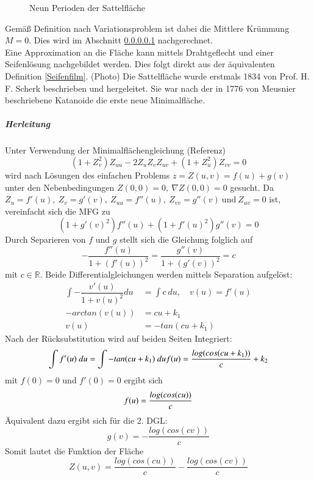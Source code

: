 \begin{refsection}
\begin{figure}[H]
  \caption{Neun Perioden der Sattelfläche} 
\end{figure}
Gemäß Definition nach Variationsproblem ist dabei die Mittlere Krümmung $M=0$. Dies wird im Abschnitt \ref{Scherk Herleitung}  nachgerechnet.\\ Eine Approximation an die Fläche kann mittels Drahtgeflecht und einer Seifenlösung nachgebildet werden. Dies folgt direkt aus der äquivalenten Definition \ref{Seifenfilm}. (Photo)
Die Sattelfläche wurde erstmals 1834 von Prof. H. F. Scherk beschrieben und hergeleitet. Sie war nach der in 1776 von Meusnier beschriebene Katanoide die erste neue Minimalfläche. 
\subparagraph{Herleitung}\label{Scherk Herleitung}
Unter Verwendung der Minimalflächengleichung (Referenz)
\begin{equation}\label{Minimalflaechengleichung}
(1+ Z_v^{2})Z_{uu} - 2 Z_u Z_v Z_{uv} + (1+ Z_u^{2}) Z_{vv}=0
\end{equation}
wird nach Lösungen des einfachen Problems $z=Z(u,v)=f(u)+g(v)$ unter den Nebenbedingungen $Z(0,0)=0,\ \nabla Z(0,0)=0$ gesucht. 
Da $ Z_u = f'(u),\ Z_v = g'(v),\ Z_{uu}=f''(u),\ Z_{vv} = g''(v) \ \text{und} \ Z_{uv}=0$ ist, vereinfacht sich die MFG zu 
\begin{equation}\label{MFG Scherk}
(1+g'(v)^2)f''(u)+(1+f'(u)^2)g''(v)=0
\end{equation}
Durch Separieren von $f$ und $g$ stellt sich die Gleichung folglich auf
\begin{equation}\label{MFG Scherk2}
-\dfrac{f''(u)}{1+(f'(u))^2}=\dfrac{g''(v)}{1+(g'(v))^2}=c
\end{equation}
mit $c \in \mathbb{R}$.
Beide Differentialgleichungen werden mittels Separation aufgelöst:
\begin{equation}\label{ScherkDGL1}
\begin{split}
\int -\dfrac{v'(u)}{1+v(u)^2} du &= \int c \ du , \quad v(u)=f'(u) \\
-arctan(v(u)) &= cu+k_1 \\
v(u) &= -tan(cu+k_1)
\end{split}
\end{equation}
Nach der Rücksubstitution wird auf beiden Seiten Integriert:
\begin{equation}\label{SchreckDGL2}
\int f'(u)\ du = \int -tan(cu+k_1)\ du\\
f(u) = \dfrac{log(cos(cu+k_1))}{c}+k_2\\
\end{equation}
mit $f(0)=0$ und $f'(0)=0$ ergibt sich
\begin{equation}
f(u) = \dfrac{log(cos(cu))}{c}\\
\end{equation}
Äquivalent dazu ergibt sich für die 2. DGL:
\begin{equation}
g(v) = - \dfrac{log(cos(cv))}{c}
\end{equation}
Somit lautet die Funktion der Fläche
\begin{equation}
Z(u,v)=\dfrac{log(cos(cu))}{c}-\dfrac{log(cos(cv))}{c}
\end{equation}


\end{refsection}
